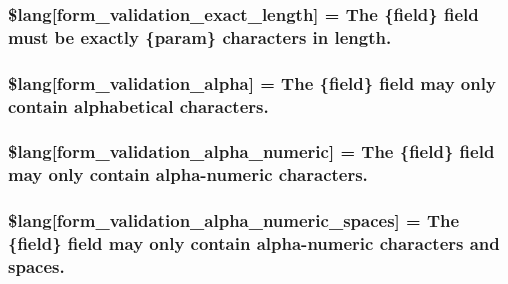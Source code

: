 \subsubsection[{\$lang}]{\setlength{\rightskip}{0pt plus 5cm}\$lang\mbox{[}\textquotesingle{}form\+\_\+validation\+\_\+exact\+\_\+length\textquotesingle{}\mbox{]} = \textquotesingle{}The \{field\} field must be exactly \{param\} characters in length.\textquotesingle{}}\label{form__validation__lang_8php_ad6d3daf6617c3906bc88d6801e74c6c5}
\hypertarget{form__validation__lang_8php_a27ff6ba34db740db678c05baa95077bf}{}
\subsubsection[{\$lang}]{\setlength{\rightskip}{0pt plus 5cm}\$lang\mbox{[}\textquotesingle{}form\+\_\+validation\+\_\+alpha\textquotesingle{}\mbox{]} = \textquotesingle{}The \{field\} field may only contain alphabetical characters.\textquotesingle{}}\label{form__validation__lang_8php_a27ff6ba34db740db678c05baa95077bf}
\hypertarget{form__validation__lang_8php_ad76e433e4991ed7404c0d44ab47119c0}{}
\subsubsection[{\$lang}]{\setlength{\rightskip}{0pt plus 5cm}\$lang\mbox{[}\textquotesingle{}form\+\_\+validation\+\_\+alpha\+\_\+numeric\textquotesingle{}\mbox{]} = \textquotesingle{}The \{field\} field may only contain alpha-\/numeric characters.\textquotesingle{}}\label{form__validation__lang_8php_ad76e433e4991ed7404c0d44ab47119c0}
\hypertarget{form__validation__lang_8php_a8909b4a4c25b40e7ed1a27cc5b299d90}{}
\subsubsection[{\$lang}]{\setlength{\rightskip}{0pt plus 5cm}\$lang\mbox{[}\textquotesingle{}form\+\_\+validation\+\_\+alpha\+\_\+numeric\+\_\+spaces\textquotesingle{}\mbox{]} = \textquotesingle{}The \{field\} field may only contain alpha-\/numeric characters and spaces.\textquotesingle{}}\label{form__validation__lang_8php_a8909b4a4c25b40e7ed1a27cc5b299d90}
\hypertarget{form__validation__lang_8php_a95a401451435c56b9792be96ffa1bb36}{}
